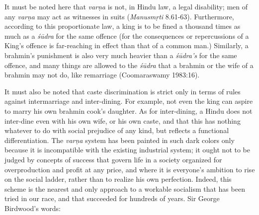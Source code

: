 It must be noted here that {\sl varṇa} is not, in Hindu law, a legal disability; men of any {\sl varṇa} may act as witnesses in suits ({\sl Manusmṛti} 8.61-63). Furthermore, according to this proportionate law, a king is to be fined a thousand times as much as a {\sl śūdra} for the same offence (for the consequences or repercussions of a King’s offence is far-reaching in effect than that of a common man.) Similarly, a brahmin’s punishment is also very much heavier than a {\sl śūdra’s} for the same offence, and many things are allowed to the {\sl śūdra} that a brahmin or the wife of a brahmin may not do, like remarriage (Coomaraswamy 1983:16). 

It must also be noted that caste discrimination is strict only in terms of rules against intermarriage and inter-dining. For example, not even the king can aspire to marry his own brahmin cook’s daughter. As for inter-dining, a Hindu does not inter-dine even with his own wife, or his own caste, and that this has nothing whatever to do with social prejudice of any kind, but reflects a functional differentiation. The {\sl varṇa} system has been painted in such dark colors only because it is incompatible with the existing industrial system; it ought not to be judged by concepts of success that govern life in a society organized for overproduction and profit at any price, and where it is everyone’s ambition to rise on the social ladder, rather than to realize his own perfection. Indeed, this scheme is the nearest and only approach to a workable socialism that has been tried in our race, and that succeeded for hundreds of years. Sir George Birdwood’s words: 

